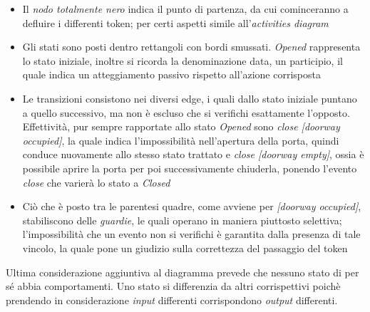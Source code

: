 \documentclass{article}
\begin{document}
\begin{itemize}[label={-}]
    \itemsep0em
    \item Il \textit{nodo totalmente nero} indica il punto di partenza, da cui cominceranno a defluire i differenti token; per certi aspetti simile all'\textit{activities diagram}
    \item Gli stati sono posti dentro rettangoli con bordi smussati. \textit{Opened} rappresenta lo stato iniziale, inoltre si ricorda la denominazione data, un participio, il quale indica un atteggiamento passivo rispetto all'azione corrisposta
    \item Le transizioni consistono nei diversi edge, i quali dallo stato iniziale puntano a quello successivo, ma non è escluso che si verifichi esattamente l'opposto. Effettività, pur sempre rapportate allo stato \textit{Opened} sono \textit{close [doorway occupied]}, la quale indica l'impossibilità nell'apertura della porta, quindi conduce nuovamente allo stesso stato trattato e \textit{close [doorway empty]}, ossia è possibile aprire la porta per poi successivamente chiuderla, ponendo l'evento \textit{close} che varierà lo stato a \textit{Closed} 
    \item Ciò che è posto tra le parentesi quadre, come avviene per \textit{[doorway occupied]}, stabiliscono delle \textit{guardie}, le quali operano in maniera piuttosto selettiva; l'impossibilità che un evento non si verifichi è garantita dalla presenza di tale vincolo, la quale pone un giudizio sulla correttezza del passaggio del token
\end{itemize}
Ultima considerazione aggiuntiva al diagramma prevede che nessuno stato di per sé abbia comportamenti. Uno stato si differenzia da altri corrispettivi poichè prendendo in considerazione \textit{input} differenti corrispondono \textit{output} differenti.
\end{document}
